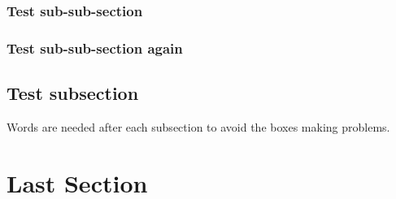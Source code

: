 \documentclass[a4paper,openany]{book}
\begin{document}
{\begin{multicols}{2}

\subsubsection{Test sub-sub-section}

\lipsum[10]

\subsubsection{Test sub-sub-section again}

\subsection{Test subsection}
Words are needed after each subsection to avoid the boxes making problems.



\lipsum[2]

\elf

\showStdSpells


\lipsum[10]

\section{Last Section}

\lipsum[3]

\end{multicols}

}

\tableofcontents



\end{document}
